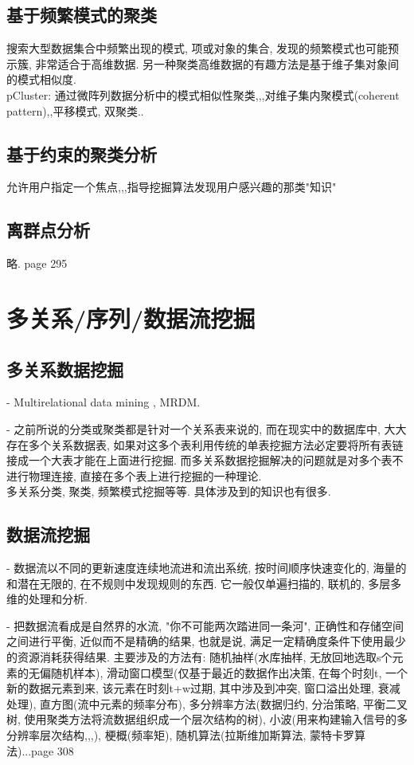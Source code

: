 \documentclass[a4paper,10pt,english]{article}
\begin{document}
\subsection {基于频繁模式的聚类}
搜索大型数据集合中频繁出现的模式, 项或对象的集合, 发现的频繁模式也可能预示簇, 非常适合于高维数据. 另一种聚类高维数据的有趣方法是基于维子集对象间的模式相似度. \\
pCluster: 通过微阵列数据分析中的模式相似性聚类,,,对维子集内聚模式(coherent pattern),,平移模式, 双聚类..

\subsection {基于约束的聚类分析}
允许用户指定一个焦点,,,指导挖掘算法发现用户感兴趣的那类"知识"

\subsection {离群点分析}
略. page 295


\clearpage
\section {多关系/序列/数据流挖掘}
\subsection {多关系数据挖掘}
\begin{description}
\item {-}
\small{
Multirelational data mining , MRDM. 
}
\item {-}
\small{
之前所说的分类或聚类都是针对一个关系表来说的, 而在现实中的数据库中, 大大存在多个关系数据表, 如果对这多个表利用传统的单表挖掘方法必定要将所有表链接成一个大表才能在上面进行挖掘. 而多关系数据挖掘解决的问题就是对多个表不进行物理连接, 直接在多个表上进行挖掘的一种理论. \\
多关系分类, 聚类, 频繁模式挖掘等等. 具体涉及到的知识也有很多. 
}
\end{description}

\subsection {数据流挖掘}
\begin{description}
\item {-}
\small{
数据流以不同的更新速度连续地流进和流出系统, 按时间顺序快速变化的, 海量的和潜在无限的, 在不规则中发现规则的东西. 它一般仅单遍扫描的, 联机的, 多层多维的处理和分析.
}
\item {-}
\small{
把数据流看成是自然界的水流, "你不可能两次踏进同一条河", 正确性和存储空间之间进行平衡, 近似而不是精确的结果, 也就是说, 满足一定精确度条件下使用最少的资源消耗获得结果. 主要涉及的方法有: 随机抽样(水库抽样, 无放回地选取s个元素的无偏随机样本), 滑动窗口模型(仅基于最近的数据作出决策, 在每个时刻t, 一个新的数据元素到来, 该元素在时刻t+w过期, 其中涉及到冲突, 窗口溢出处理, 衰减处理), 直方图(流中元素的频率分布), 多分辨率方法(数据归约, 分治策略, 平衡二叉树, 使用聚类方法将流数据组织成一个层次结构的树), 小波(用来构建输入信号的多分辨率层次结构,,,), 梗概(频率矩), 随机算法(拉斯维加斯算法, 蒙特卡罗算法)...page 308 
}
\end{description}
\end{document}

